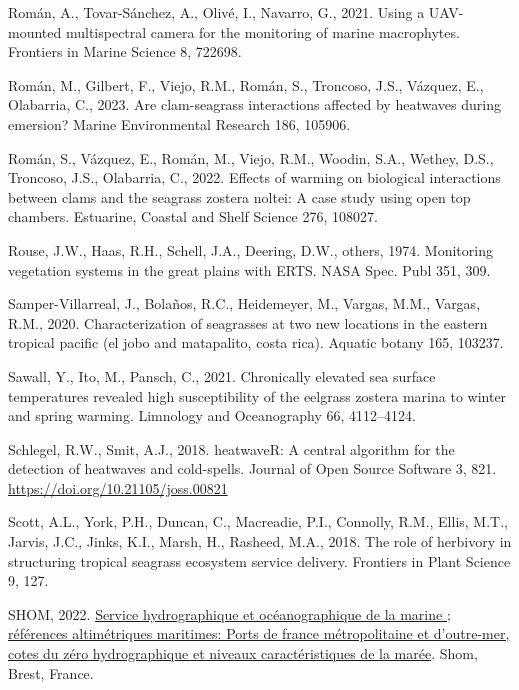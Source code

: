 \documentclass[
  letterpaper,
  DIV=11,
  numbers=noendperiod]{scrartcl}
\newlength{\cslhangindent}
\newenvironment{CSLReferences}[2] %
 {\begin{list}{}{%
  \setlength{\itemindent}{0pt}
  \setlength{\leftmargin}{0pt}
  \setlength{\parsep}{0pt}
  \ifodd #1
   \setlength{\leftmargin}{\cslhangindent}
   \setlength{\itemindent}{-1\cslhangindent}
  \fi
  \setlength{\itemsep}{#2\baselineskip}}}
 {\end{list}}
\begin{document}
\begin{CSLReferences}{1}{0}
Román, A., Tovar-Sánchez, A., Olivé, I., Navarro, G., 2021. Using a
UAV-mounted multispectral camera for the monitoring of marine
macrophytes. Frontiers in Marine Science 8, 722698.

Román, M., Gilbert, F., Viejo, R.M., Román, S., Troncoso, J.S., Vázquez,
E., Olabarria, C., 2023. Are clam-seagrass interactions affected by
heatwaves during emersion? Marine Environmental Research 186, 105906.

Román, S., Vázquez, E., Román, M., Viejo, R.M., Woodin, S.A., Wethey,
D.S., Troncoso, J.S., Olabarria, C., 2022. Effects of warming on
biological interactions between clams and the seagrass zostera noltei: A
case study using open top chambers. Estuarine, Coastal and Shelf Science
276, 108027.

Rouse, J.W., Haas, R.H., Schell, J.A., Deering, D.W., others, 1974.
Monitoring vegetation systems in the great plains with ERTS. NASA Spec.
Publ 351, 309.

Samper-Villarreal, J., Bolaños, R.C., Heidemeyer, M., Vargas, M.M.,
Vargas, R.M., 2020. Characterization of seagrasses at two new locations
in the eastern tropical pacific (el jobo and matapalito, costa rica).
Aquatic botany 165, 103237.

Sawall, Y., Ito, M., Pansch, C., 2021. Chronically elevated sea surface
temperatures revealed high susceptibility of the eelgrass zostera marina
to winter and spring warming. Limnology and Oceanography 66, 4112--4124.

Schlegel, R.W., Smit, A.J., 2018. {heatwaveR}: A central algorithm for
the detection of heatwaves and cold-spells. Journal of Open Source
Software 3, 821. \url{https://doi.org/10.21105/joss.00821}

Scott, A.L., York, P.H., Duncan, C., Macreadie, P.I., Connolly, R.M.,
Ellis, M.T., Jarvis, J.C., Jinks, K.I., Marsh, H., Rasheed, M.A., 2018.
The role of herbivory in structuring tropical seagrass ecosystem service
delivery. Frontiers in Plant Science 9, 127.

SHOM, 2022.
\href{https://diffusion.shom.fr/references-altimetriques-maritimes-ram.html}{Service
hydrographique et océanographique de la marine ; références
altimétriques maritimes: Ports de france métropolitaine et d'outre-mer,
cotes du zéro hydrographique et niveaux caractéristiques de la marée}.
Shom, Brest, France.


\end{CSLReferences}
\end{document}
